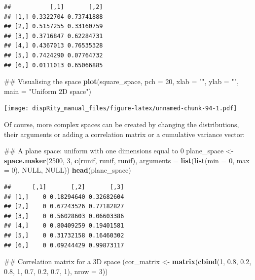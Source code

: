 \documentclass[]{book}
\newenvironment{Shaded}{\begin{snugshade}}{\end{snugshade}}
\newcommand{\KeywordTok}[1]{\textcolor[rgb]{0.13,0.29,0.53}{\textbf{#1}}}
\newcommand{\DataTypeTok}[1]{\textcolor[rgb]{0.13,0.29,0.53}{#1}}
\newcommand{\DecValTok}[1]{\textcolor[rgb]{0.00,0.00,0.81}{#1}}
\newcommand{\FloatTok}[1]{\textcolor[rgb]{0.00,0.00,0.81}{#1}}
\newcommand{\StringTok}[1]{\textcolor[rgb]{0.31,0.60,0.02}{#1}}
\newcommand{\OtherTok}[1]{\textcolor[rgb]{0.56,0.35,0.01}{#1}}
\newcommand{\NormalTok}[1]{#1}
\theoremstyle{definition}
\theoremstyle{definition}
\theoremstyle{definition}
\theoremstyle{remark}
\begin{document}
\begin{verbatim}
##           [,1]       [,2]
## [1,] 0.3322704 0.73741888
## [2,] 0.5157255 0.33160759
## [3,] 0.3716847 0.62284731
## [4,] 0.4367013 0.76535328
## [5,] 0.7424290 0.07764732
## [6,] 0.0111013 0.65066885
\end{verbatim}

\begin{Shaded}
\begin{Highlighting}[]
\NormalTok{## Visualising the space}
\KeywordTok{plot}\NormalTok{(square_space, }\DataTypeTok{pch =} \DecValTok{20}\NormalTok{, }\DataTypeTok{xlab =} \StringTok{""}\NormalTok{, }\DataTypeTok{ylab =} \StringTok{""}\NormalTok{, }\DataTypeTok{main =} \StringTok{"Uniform 2D space"}\NormalTok{)}
\end{Highlighting}
\end{Shaded}

\texttt{[image: dispRity\_manual\_files/figure-latex/unnamed-chunk-94-1.pdf]}

Of course, more complex spaces can be created by changing the
distributions, their arguments or adding a correlation matrix or a
cumulative variance vector:

\begin{Shaded}
\begin{Highlighting}[]
\NormalTok{## A plane space: uniform with one dimensions equal to 0}
\NormalTok{plane_space <-}\StringTok{ }\KeywordTok{space.maker}\NormalTok{(}\DecValTok{2500}\NormalTok{, }\DecValTok{3}\NormalTok{, }\KeywordTok{c}\NormalTok{(runif, runif, runif),}
                           \DataTypeTok{arguments =} \KeywordTok{list}\NormalTok{(}\KeywordTok{list}\NormalTok{(}\DataTypeTok{min =} \DecValTok{0}\NormalTok{, }\DataTypeTok{max =} \DecValTok{0}\NormalTok{), }\OtherTok{NULL}\NormalTok{, }\OtherTok{NULL}\NormalTok{))}
\KeywordTok{head}\NormalTok{(plane_space)}
\end{Highlighting}
\end{Shaded}

\begin{verbatim}
##      [,1]       [,2]       [,3]
## [1,]    0 0.18294640 0.32682604
## [2,]    0 0.67243526 0.77182827
## [3,]    0 0.56028603 0.06603386
## [4,]    0 0.80409259 0.19401581
## [5,]    0 0.31732158 0.16460302
## [6,]    0 0.09244429 0.99873117
\end{verbatim}

\begin{Shaded}
\begin{Highlighting}[]
\NormalTok{## Correlation matrix for a 3D space}
\NormalTok{(cor_matrix <-}\StringTok{ }\KeywordTok{matrix}\NormalTok{(}\KeywordTok{cbind}\NormalTok{(}\DecValTok{1}\NormalTok{, }\FloatTok{0.8}\NormalTok{, }\FloatTok{0.2}\NormalTok{, }\FloatTok{0.8}\NormalTok{, }\DecValTok{1}\NormalTok{, }\FloatTok{0.7}\NormalTok{, }\FloatTok{0.2}\NormalTok{, }\FloatTok{0.7}\NormalTok{, }\DecValTok{1}\NormalTok{), }\DataTypeTok{nrow =} \DecValTok{3}\NormalTok{))}
\end{Highlighting}
\end{Shaded}
\end{document}
